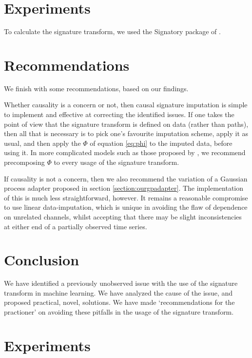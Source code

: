 \documentclass{article}
\begin{document}
\section{Experiments}
To calculate the signature transform, we used the Signatory package of \citet{signatory}.


\section{Recommendations}
We finish with some recommendations, based on our findings.

Whether causality is a concern or not, then causal signature imputation is simple to implement and effective at correcting the identified issues. If one takes the point of view that the signature transform is defined on data (rather than paths), then all that is necessary is to pick one's favourite imputation scheme, apply it as usual, and then apply the $\Phi$ of equation \eqref{eq:phi} to the imputed data, before using it. In more complicated models such as those proposed by \citet{kidger2019deep}, we recommend precomposing $\Phi$ to every usage of the signature transform.

If causality is not a concern, then we also recommend the variation of a Gaussian process adapter proposed in section \ref{section:ourgpadapter}. The implementation of this is much less straightforward, however. It remains a reasonable compromise to use linear data-imputation, which is unique in avoiding the flaw of dependence on unrelated channels, whilst accepting that there may be slight inconsistencies at either end of a partially observed time series.

\section{Conclusion}
We have identified a previously unobserved issue with the use of the signature transform in machine learning. We have analyzed the cause of the issue, and proposed practical, novel, solutions. We have made `recommendations for the practioner' on avoiding these pitfalls in the usage of the signature transform.



\section{Experiments}
\end{document}
